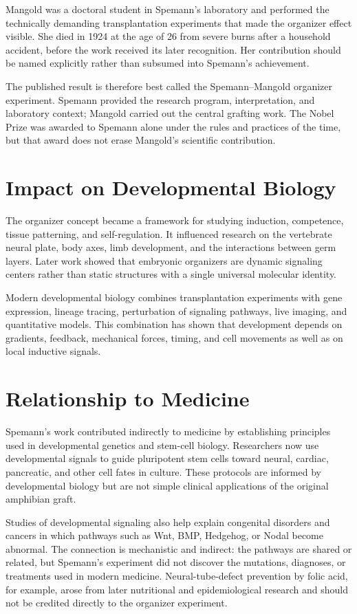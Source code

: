 Mangold was a doctoral student in Spemann's laboratory and performed the technically demanding transplantation experiments that made the organizer effect visible. She died in 1924 at the age of 26 from severe burns after a household accident, before the work received its later recognition. Her contribution should be named explicitly rather than subsumed into Spemann's achievement.

The published result is therefore best called the Spemann--Mangold organizer experiment. Spemann provided the research program, interpretation, and laboratory context; Mangold carried out the central grafting work. The Nobel Prize was awarded to Spemann alone under the rules and practices of the time, but that award does not erase Mangold's scientific contribution.

\section{Impact on Developmental Biology}

The organizer concept became a framework for studying induction, competence, tissue patterning, and self-regulation. It influenced research on the vertebrate neural plate, body axes, limb development, and the interactions between germ layers. Later work showed that embryonic organizers are dynamic signaling centers rather than static structures with a single universal molecular identity.

Modern developmental biology combines transplantation experiments with gene expression, lineage tracing, perturbation of signaling pathways, live imaging, and quantitative models. This combination has shown that development depends on gradients, feedback, mechanical forces, timing, and cell movements as well as on local inductive signals.

\section{Relationship to Medicine}

Spemann's work contributed indirectly to medicine by establishing principles used in developmental genetics and stem-cell biology. Researchers now use developmental signals to guide pluripotent stem cells toward neural, cardiac, pancreatic, and other cell fates in culture. These protocols are informed by developmental biology but are not simple clinical applications of the original amphibian graft.

Studies of developmental signaling also help explain congenital disorders and cancers in which pathways such as Wnt, BMP, Hedgehog, or Nodal become abnormal. The connection is mechanistic and indirect: the pathways are shared or related, but Spemann's experiment did not discover the mutations, diagnoses, or treatments used in modern medicine. Neural-tube-defect prevention by folic acid, for example, arose from later nutritional and epidemiological research and should not be credited directly to the organizer experiment.

